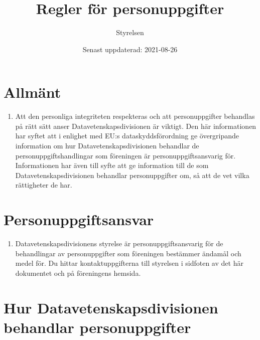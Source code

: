 \documentclass{dvd}
\begin{document}
    \title{Regler för personuppgifter}
	\author{Styrelsen}
	\date{Senast uppdaterad: 2021-08-26}

    \section{Allmänt}

    \begin{enumerate}[label=\arabic* \S, ref=\arabic*]
        \item Att den personliga integriteten respekteras och att personuppgifter behandlas på rätt sätt anser Datavetenskapsdivisionen är viktigt.
		Den här informationen har syftet att i enlighet med EU:s dataskyddsförordning ge övergripande information om hur Datavetenskapsdivisionen behandlar de personuppgiftshandlingar som föreningen är personuppgiftsansvarig för.
		Informationen har även till syfte att ge information till de som Datavetenskapsdivisionen behandlar personuppgifter om, så att de vet vilka rättigheter de har.
    \end{enumerate}

    \section{Personuppgiftsansvar}

    \begin{enumerate}[label=\arabic* \S, ref=\arabic*]
        \item Datavetenskapsdivisionens styrelse är personuppgiftsansvarig för de behandlingar av personuppgifter som föreningen bestämmer ändamål och medel för.
		Du hittar kontaktuppgifterna till styrelsen i sidfoten av det här dokumentet och på föreningens hemsida.
    \end{enumerate}

    \section{Hur Datavetenskapsdivisionen behandlar personuppgifter}
\end{document}
